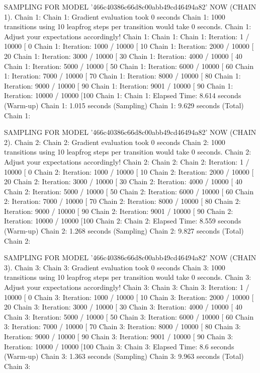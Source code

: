 \documentclass[
]{jss}
\begin{document}
\begin{CodeChunk}
\begin{CodeOutput}
SAMPLING FOR MODEL '466c40386c66d8c00abb49cd46494a82' NOW (CHAIN 1).
Chain 1: 
Chain 1: Gradient evaluation took 0 seconds
Chain 1: 1000 transitions using 10 leapfrog steps per transition would take 0 seconds.
Chain 1: Adjust your expectations accordingly!
Chain 1: 
Chain 1: 
Chain 1: Iteration:    1 / 10000 [  0%
Chain 1: Iteration: 1000 / 10000 [ 10%
Chain 1: Iteration: 2000 / 10000 [ 20%
Chain 1: Iteration: 3000 / 10000 [ 30%
Chain 1: Iteration: 4000 / 10000 [ 40%
Chain 1: Iteration: 5000 / 10000 [ 50%
Chain 1: Iteration: 6000 / 10000 [ 60%
Chain 1: Iteration: 7000 / 10000 [ 70%
Chain 1: Iteration: 8000 / 10000 [ 80%
Chain 1: Iteration: 9000 / 10000 [ 90%
Chain 1: Iteration: 9001 / 10000 [ 90%
Chain 1: Iteration: 10000 / 10000 [100%
Chain 1: 
Chain 1:  Elapsed Time: 8.614 seconds (Warm-up)
Chain 1:                1.015 seconds (Sampling)
Chain 1:                9.629 seconds (Total)
Chain 1: 

SAMPLING FOR MODEL '466c40386c66d8c00abb49cd46494a82' NOW (CHAIN 2).
Chain 2: 
Chain 2: Gradient evaluation took 0 seconds
Chain 2: 1000 transitions using 10 leapfrog steps per transition would take 0 seconds.
Chain 2: Adjust your expectations accordingly!
Chain 2: 
Chain 2: 
Chain 2: Iteration:    1 / 10000 [  0%
Chain 2: Iteration: 1000 / 10000 [ 10%
Chain 2: Iteration: 2000 / 10000 [ 20%
Chain 2: Iteration: 3000 / 10000 [ 30%
Chain 2: Iteration: 4000 / 10000 [ 40%
Chain 2: Iteration: 5000 / 10000 [ 50%
Chain 2: Iteration: 6000 / 10000 [ 60%
Chain 2: Iteration: 7000 / 10000 [ 70%
Chain 2: Iteration: 8000 / 10000 [ 80%
Chain 2: Iteration: 9000 / 10000 [ 90%
Chain 2: Iteration: 9001 / 10000 [ 90%
Chain 2: Iteration: 10000 / 10000 [100%
Chain 2: 
Chain 2:  Elapsed Time: 8.559 seconds (Warm-up)
Chain 2:                1.268 seconds (Sampling)
Chain 2:                9.827 seconds (Total)
Chain 2: 

SAMPLING FOR MODEL '466c40386c66d8c00abb49cd46494a82' NOW (CHAIN 3).
Chain 3: 
Chain 3: Gradient evaluation took 0 seconds
Chain 3: 1000 transitions using 10 leapfrog steps per transition would take 0 seconds.
Chain 3: Adjust your expectations accordingly!
Chain 3: 
Chain 3: 
Chain 3: Iteration:    1 / 10000 [  0%
Chain 3: Iteration: 1000 / 10000 [ 10%
Chain 3: Iteration: 2000 / 10000 [ 20%
Chain 3: Iteration: 3000 / 10000 [ 30%
Chain 3: Iteration: 4000 / 10000 [ 40%
Chain 3: Iteration: 5000 / 10000 [ 50%
Chain 3: Iteration: 6000 / 10000 [ 60%
Chain 3: Iteration: 7000 / 10000 [ 70%
Chain 3: Iteration: 8000 / 10000 [ 80%
Chain 3: Iteration: 9000 / 10000 [ 90%
Chain 3: Iteration: 9001 / 10000 [ 90%
Chain 3: Iteration: 10000 / 10000 [100%
Chain 3: 
Chain 3:  Elapsed Time: 8.6 seconds (Warm-up)
Chain 3:                1.363 seconds (Sampling)
Chain 3:                9.963 seconds (Total)
Chain 3: 


\end{CodeOutput}
\end{CodeChunk}
\end{document}
